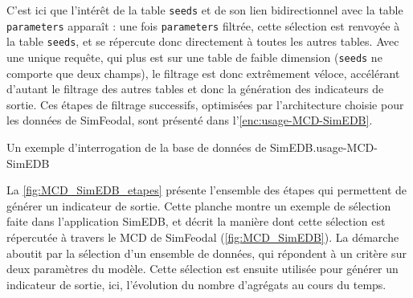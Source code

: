 C'est ici que l'intérêt de la table \texttt{seeds} et de son lien bidirectionnel avec la table \texttt{parameters} apparaît : une fois \texttt{parameters} filtrée, cette sélection est renvoyée à la table \texttt{seeds}, et se répercute donc directement à toutes les autres tables.
Avec une unique requête, qui plus est sur une table de faible dimension (\texttt{seeds} ne comporte que deux champs), le filtrage est donc extrêmement véloce, accélérant d'autant le filtrage des autres tables et donc la génération des indicateurs de sortie.
Ces étapes de filtrage successifs, optimisées par l'architecture choisie pour les données de SimFeodal, sont présenté dans l'\cref{enc:usage-MCD-SimEDB}.

\clearpage

\begin{encadre}{Un exemple d'interrogation de la base de données de SimEDB.}{usage-MCD-SimEDB}
	
	La \cref{fig:MCD_SimEDB_etapes} présente l'ensemble des étapes qui permettent de générer un indicateur de sortie.
	Cette planche montre un exemple de sélection faite dans l'application SimEDB, et décrit la manière dont cette sélection est répercutée à travers le MCD de SimFeodal (\cref{fig:MCD_SimEDB}).
	La démarche aboutit par la sélection d'un ensemble de données, qui répondent à un critère sur deux paramètres du modèle.
	Cette sélection est ensuite utilisée pour générer un indicateur de sortie, ici, l'évolution du nombre d'agrégats au cours du temps.
	

\end{encadre}
